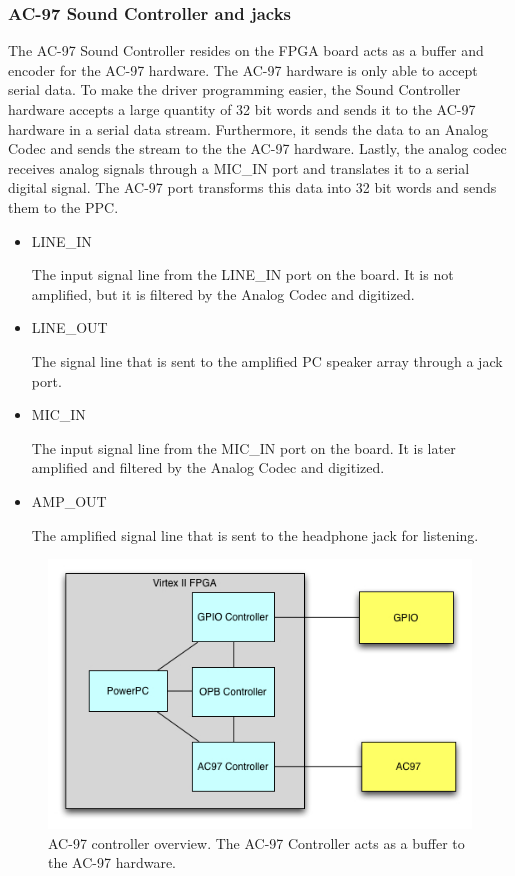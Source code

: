 \documentclass[11pt,letter,oneside]{report}
\begin{document}
	\subsubsection{AC-97 Sound Controller and jacks}
		The AC-97 Sound Controller resides on the FPGA board acts as a buffer and encoder for the AC-97 hardware. The AC-97 hardware is only able to accept serial data. To make the driver programming easier, the Sound Controller hardware accepts a large quantity of 32 bit words and sends it to the AC-97 hardware in a serial data stream. Furthermore, it sends the data to an Analog Codec and sends the stream to the the AC-97 hardware. Lastly, the analog codec receives analog signals through a MIC\_IN port and translates it to a serial digital signal. The AC-97 port transforms this data into 32 bit words and sends them to the PPC.
		\begin{itemize}
		\item LINE\_IN

		The input signal line from the LINE\_IN port on the board. It is not amplified, but it is filtered by the Analog Codec and digitized.
		\item LINE\_OUT

		The signal line that is sent to the amplified PC speaker array through a jack port.
		\item MIC\_IN

		The input signal line from the MIC\_IN port on the board. It is later amplified and filtered by the Analog Codec and digitized.
		\item AMP\_OUT
		
		The amplified signal line that is sent to the headphone jack for listening.
		\end{itemize}
		\begin{figure}[ht]
		\centering
		\includegraphics[scale=.8]{AC97.jpg}
		\caption{AC-97 controller overview. The AC-97 Controller acts as a buffer to the AC-97 hardware.}
		\label{fig:overview}
		\end{figure}
\end{document}
